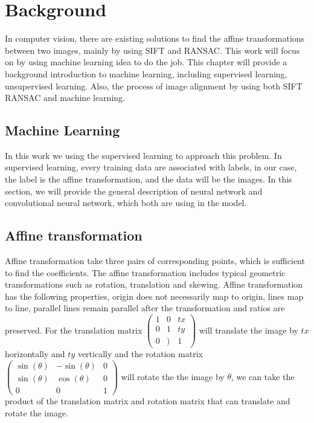 \chapter{Background}
In computer vision\cite{forsyth2002computer}, there are existing solutions to find the affine transformations\cite{mikolajczyk2004scale} between two images, mainly by using SIFT\cite{lowe2004distinctive} and RANSAC\cite{fischler1981random}. This work will focus on by using machine learning idea to do the job. This chapter will provide a background introduction to machine learning, including supervised learning, unsupervised learning. Also, the process of image alignment by using both SIFT RANSAC and machine learning.
\section{Machine Learning}
In this work we using the supervised learning to approach this problem. In supervised learning, every training data are associated with labels, in our case, the label is the affine transformation, and the data will be the images. In this section, we will provide the general description of neural network and convolutional neural network, which both are using in the model.

\section{Affine transformation}
Affine transformation\cite{svoboda2007image} take three pairs of corresponding points, which is sufficient to find the coefficients. The affine transformation includes typical geometric transformations such as rotation, translation and skewing. Affine transformation has the following properties, origin does not necessarily map to origin, lines map to line, parallel lines remain parallel after the transformation and ratios are preserved. For the translation matrix 
$\begin{pmatrix}
1&0&tx \\
0&1&ty \\
0&)&1
\end{pmatrix}$
will translate the image by $tx$ horizontally and $ty$ vertically and the rotation matrix 
$\begin{pmatrix}
\sin(\theta)&-\sin(\theta)&0 \\
\sin(\theta)&\cos(\theta)&0 \\
0&0&1
\end{pmatrix}$ will rotate the the image by $\theta$, we can take the product of the translation matrix and rotation matrix that can translate and rotate the image. 

